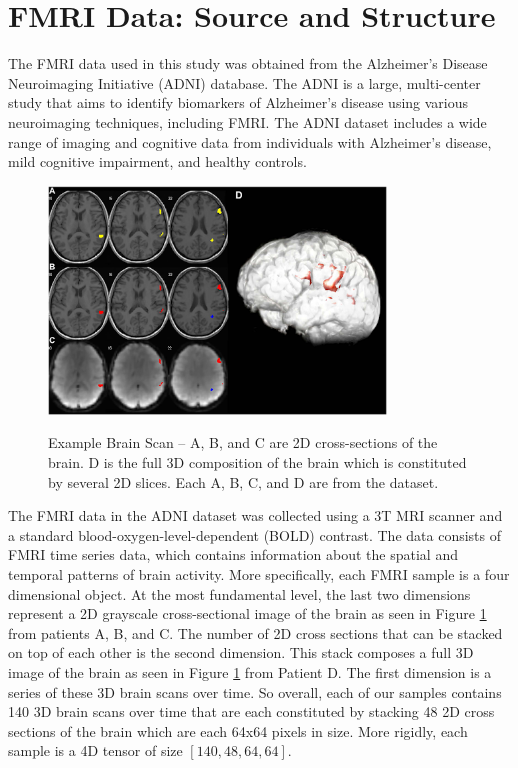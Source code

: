 \documentclass[11pt]{article}
\begin{document}
	\section{FMRI Data: Source and Structure}
	\label{sec:data}

	The FMRI data used in this study was obtained from the Alzheimer's Disease Neuroimaging Initiative (ADNI) database. The ADNI is a large, multi-center study that aims to identify biomarkers of Alzheimer's disease using various neuroimaging techniques, including FMRI. The ADNI dataset includes a wide range of imaging and cognitive data from individuals with Alzheimer's disease, mild cognitive impairment, and healthy controls.

	\begin{figure}[!ht]
		\centering
		\includegraphics[width=0.8\textwidth]{figures/scan.png}
		\caption{Example Brain Scan -- A, B, and C are 2D cross-sections of the brain. D is the full 3D composition of the brain which is constituted by several 2D slices. Each A, B, C, and D are from the dataset.}
		\label{fig:example_brain_scan}
		\citep*{radiomic_texture_analysis}
	\end{figure}



	The FMRI data in the ADNI dataset was collected using a 3T MRI scanner and a standard blood-oxygen-level-dependent (BOLD) contrast. The data consists of FMRI time series data, which contains information about the spatial and temporal patterns of brain activity. More specifically, each FMRI sample is a four dimensional object. At the most fundamental level, the last two dimensions represent a 2D grayscale cross-sectional image of the brain as seen in Figure \ref{fig:example_brain_scan} from patients A, B, and C. The number of 2D cross sections that can be stacked on top of each other is the second dimension. This stack composes a full 3D image of the brain as seen in Figure \ref{fig:example_brain_scan} from Patient D. The first dimension is a series of these 3D brain scans over time. So overall, each of our samples contains 140 3D brain scans over time that are each constituted by stacking 48 2D cross sections of the brain which are each 64x64 pixels in size. More rigidly, each sample is a 4D tensor of size $[140, 48, 64, 64]$.
\end{document}
